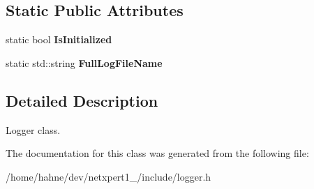 \subsection*{Static Public Attributes}
\begin{DoxyCompactItemize}
\item 
static bool {\bfseries Is\+Initialized}\hypertarget{classnetxpert_1_1utils_1_1LOGGER_a7577f62a660b9897d686cdfe88ae441d}{}\label{classnetxpert_1_1utils_1_1LOGGER_a7577f62a660b9897d686cdfe88ae441d}

\item 
static std\+::string {\bfseries Full\+Log\+File\+Name}\hypertarget{classnetxpert_1_1utils_1_1LOGGER_a8235454671e8ef5030e271479a01e0f7}{}\label{classnetxpert_1_1utils_1_1LOGGER_a8235454671e8ef5030e271479a01e0f7}

\end{DoxyCompactItemize}


\subsection{Detailed Description}
Logger class. 

The documentation for this class was generated from the following file\+:\begin{DoxyCompactItemize}
\item 
/home/hahne/dev/netxpert1\+\_/include/logger.\+h\end{DoxyCompactItemize}
